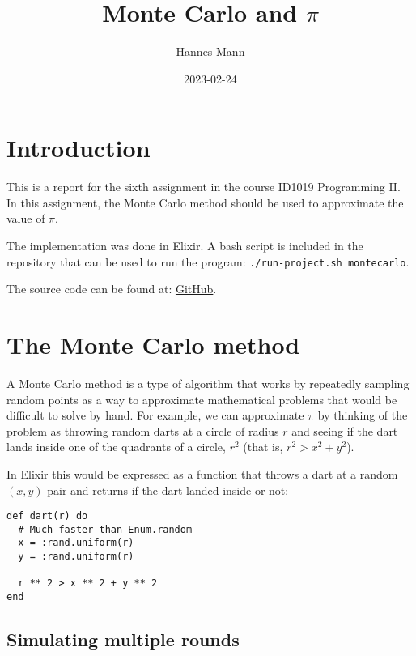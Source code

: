 \documentclass[a4paper,11pt]{article}
\begin{document}
\title{
    \textbf{Monte Carlo and $\pi$}
}
\author{Hannes Mann}
\date{2023-02-24}

\maketitle

\section*{Introduction}

This is a report for the sixth assignment in the course ID1019 Programming II.
In this assignment, the Monte Carlo method should be used to approximate the value of $\pi$.

The implementation was done in Elixir. A bash script is included in the repository that can be used to run the program: \texttt{./run-project.sh montecarlo}.

The source code can be found at: \href{https://github.com/hannesmann/ID1019/tree/main/src/montecarlo}{GitHub}.

\section*{The Monte Carlo method}

A Monte Carlo method is a type of algorithm that works by repeatedly sampling random points as a way to approximate mathematical problems that would be difficult to solve by hand.
For example, we can approximate $\pi$ by thinking of the problem as throwing random darts at a circle of radius $r$ and seeing if the dart lands inside one of the quadrants of a circle, $r^2$ (that is, $r^2 > x^2 + y^2$).

In Elixir this would be expressed as a function that throws a dart at a random $(x, y)$ pair and returns if the dart landed inside or not:

\begin{verbatim}
def dart(r) do
  # Much faster than Enum.random
  x = :rand.uniform(r)
  y = :rand.uniform(r)

  r ** 2 > x ** 2 + y ** 2
end
\end{verbatim}

\subsection*{Simulating multiple rounds}
\end{document}

